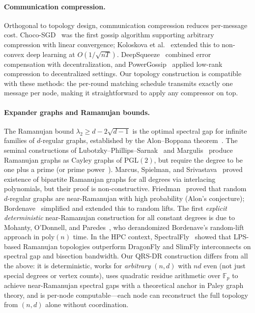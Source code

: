 \documentclass{article}
\newcommand{\lam}{\lambda_2}
\begin{document}
\paragraph{Communication compression.}
Orthogonal to topology design, communication compression reduces
per-message cost.
Choco-SGD~\cite{koloskova2019choco} was the first gossip algorithm
supporting arbitrary compression with linear convergence;
Koloskova et al.~\cite{koloskova2020chocosgd} extended this to
non-convex deep learning at $O(1/\sqrt{nT})$.
DeepSqueeze~\cite{tang2019deepsqueeze} combined error compensation
with decentralization, and
PowerGossip~\cite{vogels2020powergossip} applied low-rank compression
to decentralized settings.
Our topology construction is compatible with these methods: the
per-round matching schedule transmits exactly one message per node,
making it straightforward to apply any compressor on top.

\paragraph{Expander graphs and Ramanujan bounds.}
The Ramanujan bound $\lam \ge d - 2\sqrt{d-1}$ is the optimal spectral
gap for infinite families of $d$-regular graphs, established by the
Alon--Boppana theorem~\cite{nilli1991, alon1986}.
The seminal constructions of Lubotzky--Phillips--Sarnak~\cite{lps1988}
and Margulis~\cite{margulis1988} produce Ramanujan graphs as Cayley
graphs of PGL$(2)$, but require the degree to be one plus a prime
(or prime power~\cite{morgenstern1994}).
Marcus, Spielman, and Srivastava~\cite{mss2015} proved existence of
bipartite Ramanujan graphs for all degrees via interlacing polynomials,
but their proof is non-constructive.
Friedman~\cite{friedman2008} proved that random $d$-regular graphs are
near-Ramanujan with high probability (Alon's conjecture);
Bordenave~\cite{bordenave2015} simplified and extended this to random
lifts.
The first \emph{explicit deterministic} near-Ramanujan construction for
all constant degrees is due to Mohanty, O'Donnell, and
Paredes~\cite{mohanty2020}, who derandomized Bordenave's random-lift
approach in poly$(n)$ time.
In the HPC context, SpectralFly~\cite{young2022spectralfly} showed that
LPS-based Ramanujan topologies outperform DragonFly and SlimFly
interconnects on spectral gap and bisection bandwidth.
Our QRS-DR construction differs from all the above: it is
deterministic, works for \emph{arbitrary} $(n, d)$ with $nd$ even
(not just special degrees or vertex counts), uses quadratic residue
arithmetic over $\mathbb{F}_p$ to achieve near-Ramanujan spectral gaps
with a theoretical anchor in Paley graph theory, and is per-node
computable---each node can reconstruct the full topology from $(n,d)$
alone without coordination.
\end{document}
